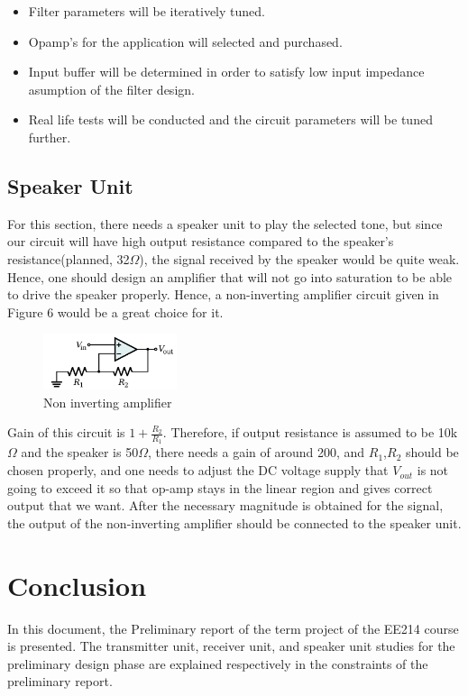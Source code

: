 \documentclass[letterpaper,12pt]{article}
\begin{document}
\begin{itemize}
    \item Filter parameters will be iteratively tuned.
    \item Opamp's for the application will selected and purchased.
    \item Input buffer will be determined in order to satisfy low input impedance asumption of the filter design.
    \item Real life tests will be conducted and the circuit parameters will be tuned further.
\end{itemize}
\subsection{Speaker Unit}
For this section, there needs a speaker unit to play the selected tone, but since our circuit will have high output resistance compared to the speaker's resistance(planned, 32\(\Omega\)), the signal received by the speaker would be quite weak. Hence, one should design an amplifier that will not go into saturation to be able to drive the speaker properly. Hence, a non-inverting amplifier circuit given in Figure 6 would be a great choice for it. 
\begin{figure}[H]
    \centering
    \includegraphics[width = 0.35\textwidth]{Non-Inverting_Amplifier.svg.png}
    \caption{Non inverting amplifier}
\end{figure} 
Gain of this circuit is \(1 + \frac{R_2}{R_1}\). Therefore, if output resistance is assumed to be 10k\(\Omega\) and the speaker is 50\(\Omega\), there needs a gain of around 200, and \(R_1\),\(R_2\) should be chosen properly, and one needs to adjust the DC voltage supply that \(V_{out}\) is not going to exceed it so that op-amp stays in the linear region and gives correct output that we want. After the necessary magnitude is obtained for the signal, the output of the non-inverting amplifier should be connected to the speaker unit.
\vspace{-4mm}
\section{Conclusion}
In this document, the Preliminary report of the term project of the EE214 course is presented. The transmitter unit, receiver unit, and speaker unit studies for the preliminary design phase are explained respectively in the constraints of the preliminary report.
\end{document}
